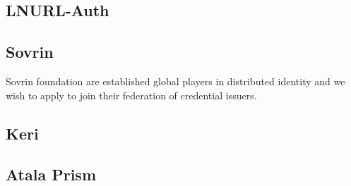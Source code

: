 \subsection{LNURL-Auth}
\lipsum[50]
\subsection{Sovrin}
Sovrin foundation are established global players in distributed identity and we wish to apply to join their federation of credential issuers.
\subsection{Keri}
\lipsum[50]
\subsection{Atala Prism}
\lipsum[50]
